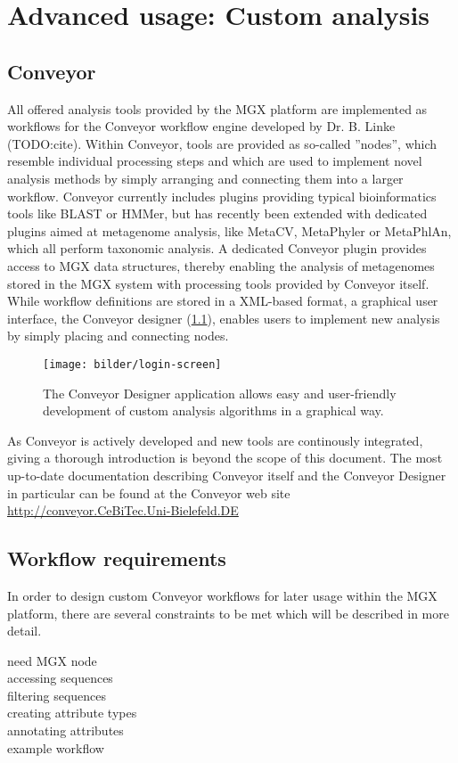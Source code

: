
\chapter{Advanced usage: Custom analysis}
\label{custom}

\section{Conveyor}

All offered analysis tools provided by the MGX platform are implemented as workflows
for the Conveyor workflow engine developed by Dr. B. Linke (TODO:cite). Within Conveyor,
tools are provided as so-called ''nodes'', which resemble individual processing steps
and which are used to implement novel analysis methods by simply arranging and connecting
them into a larger workflow. Conveyor currently includes plugins providing typical
bioinformatics tools like BLAST or HMMer, but has recently been extended with dedicated
plugins aimed at metagenome analysis, like MetaCV, MetaPhyler or MetaPhlAn, which all
perform taxonomic analysis.
A dedicated Conveyor plugin provides access to MGX data structures, thereby enabling the
analysis of metagenomes stored in the MGX system with processing tools provided by Conveyor
itself.
While workflow definitions are stored in a XML-based format, a graphical user interface,
the Conveyor designer (\ref{designer}), enables users to implement new analysis by simply
placing and connecting nodes.

\begin{figure}[ht]
\centering
\texttt{[image: bilder/login-screen]}
\caption['Conveyor Designer]{The Conveyor Designer application allows easy and user-friendly
development of custom analysis algorithms in a graphical way.}
\label{designer}
\end{figure}

As Conveyor is actively developed and new tools are continously integrated, giving a thorough
introduction is beyond the scope of this document. The most up-to-date documentation describing
Conveyor itself and the Conveyor Designer in particular can be found at the Conveyor web
site \url{http://conveyor.CeBiTec.Uni-Bielefeld.DE}

\section{Workflow requirements}

In order to design custom Conveyor workflows for later usage within the MGX platform, there
are several constraints to be met which will be described in more detail.

need MGX node\\
accessing sequences\\
filtering sequences\\
creating attribute types\\
annotating attributes\\
example workflow\\


